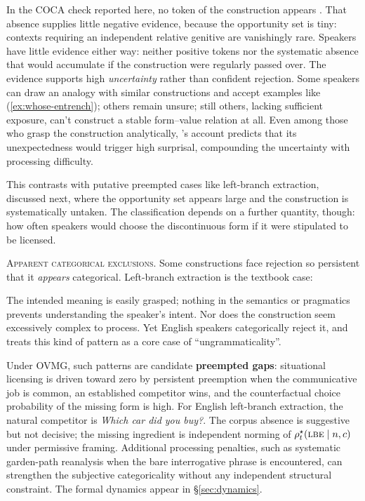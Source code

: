 \documentclass[12pt,letterpaper]{article}
\newcommand{\mention}[1]{\textit{#1}}
\begin{document}
In the COCA check reported here, no token of the construction appears
\autocite{COCA}. That absence supplies little negative evidence, because the
opportunity set is tiny: contexts requiring an independent relative genitive are
vanishingly rare. Speakers have little evidence either way: neither positive
tokens nor the systematic absence that would accumulate if the construction were
regularly passed over. The evidence supports high \emph{uncertainty} rather than
confident rejection. Some speakers can draw an analogy with similar constructions
and accept examples like (\ref{ex:whose-entrench}); others remain unsure; still
others, lacking sufficient exposure, can't construct a stable form--value
relation at all. Even among those who grasp the construction analytically,
\textcite{shain2020fmri}'s account predicts that its unexpectedness would trigger
high surprisal, compounding the uncertainty with processing difficulty.

This contrasts with putative preempted cases like left-branch extraction, discussed next, where the opportunity set appears large and the construction is systematically untaken. The classification depends on a further quantity, though: how often speakers would choose the discontinuous form if it were stipulated to be licensed.

\noindent\textsc{Apparent categorical exclusions.} Some constructions face rejection so persistent that it \emph{appears} categorical. Left-branch extraction is the textbook case:

\ea[*]{\mention{Which did you buy} [\_\_ \mention{car}]\mention{?}}\label{ex:LBC-cat}
\z

The intended meaning is easily grasped; nothing in the semantics or pragmatics prevents understanding the speaker's intent. Nor does the construction seem excessively complex to process. Yet English speakers categorically reject it, and \textcite[22]{Snyder2022} treats this kind of pattern as a core case of \enquote{ungrammaticality}.

Under OVMG, such patterns are candidate \textbf{preempted gaps}: situational
licensing is driven toward zero by persistent preemption when the communicative
job is common, an established competitor wins, and the counterfactual choice
probability of the missing form is high. For English left-branch extraction, the
natural competitor is \mention{Which car did you buy?}. The corpus absence is
suggestive but not decisive; the missing ingredient is independent norming of
$\rho_t^\star(\textsc{lbe}\mid n,c)$ under permissive framing. Additional
processing penalties, such as systematic garden-path reanalysis when the bare
interrogative phrase is encountered, can strengthen the subjective categoricality
without any independent structural constraint. The formal dynamics appear in
\S\ref{sec:dynamics}.
\end{document}
